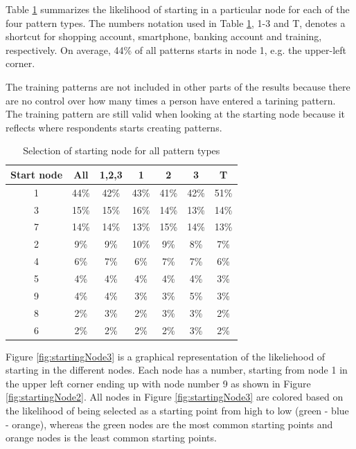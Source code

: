     Table \ref{tab:startingNode1} summarizes the likelihood of starting in a particular node for each of the four pattern types. The numbers notation used in Table \ref{tab:startingNode1}, 1-3 and T, denotes a shortcut for shopping account, smartphone, banking account and training, respectively. On average, 44\% of all patterns starts in node 1, e.g. the upper-left corner. 

    The training patterns are not included in other parts of the results  because there are no control over how many times a person have entered a tarining pattern. The training pattern are still valid when looking at the starting node because it reflects where respondents starts creating patterns. 

    \begin{table}[H]
      \centering
      \begin{tabular}{ c || c | c || c | c | c | c }
        \hline
        {\bf Start node} & All & 1,2,3 & 1 & 2 & 3 & T \\ \hline
        1 & 44\% & 42\% & 43\% & 41\% & 42\% & 51\% \\
        3 & 15\% & 15\% & 16\% & 14\% & 13\% & 14\% \\
        7 & 14\% & 14\% & 13\% & 15\% & 14\% & 13\% \\
        2 & 9\%  & 9\%  & 10\% & 9\%  & 8\%  & 7\%  \\
        4 & 6\%  & 7\%  & 6\%  & 7\%  & 7\%  & 6\%  \\
        5 & 4\%  & 4\%  & 4\%  & 4\%  & 4\%  & 3\%  \\
        9 & 4\%  & 4\%  & 3\%  & 3\%  & 5\%  & 3\%  \\
        8 & 2\%  & 3\%  & 2\%  & 3\%  & 3\%  & 2\%  \\
        6 & 2\%  & 2\%  & 2\%  & 2\%  & 3\%  & 2\%  \\ \hline
      \end{tabular}
      \caption{Selection of starting node for all pattern types}
      \label{tab:startingNode1}
    \end{table}

    Figure \ref{fig:startingNode3} is a graphical representation of the likeliehood of starting in the different nodes. Each node has a number, starting from node 1 in the upper left corner ending up with node number 9 as shown in Figure \ref{fig:startingNode2}. All nodes in Figure \ref{fig:startingNode3} are colored based on the likelihood of being selected as a starting point from high to low (green - blue - orange), whereas the green nodes are the most common starting points and orange nodes is the least common starting points.

